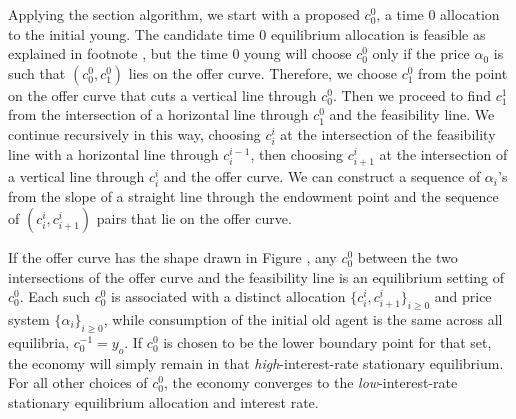 Applying the section  algorithm, we start with
a proposed $c_0^0$, a time $0$ allocation to the initial young.
The candidate time $0$ equilibrium allocation is feasible as explained in  footnote , but  the
time $0$  young will choose $c_0^0$ only if the price $\alpha_0$ is such that
$(c^0_0, c^0_1)$ lies
on the offer curve.      Therefore, we choose $c^0_1$ from
the point on the offer curve that cuts a vertical
line through  $c^0_0$.   Then we proceed to find $c^1_1$ from
the intersection of a horizontal line through $c^0_1$
and the  feasibility line.   We continue recursively in this way,
choosing $c_i^i$ at the intersection of the feasibility line
with a horizontal line through $c^{i-1}_i$, then
choosing $c_{i+1}^i$ at the intersection of a vertical
line through $c_i^i$   and the offer curve.    We can
construct a sequence of $\alpha_i$'s from the slope
of a straight line through the endowment point
and the sequence of $(c_i^i, c^i_{i+1})$  pairs that
lie on the offer curve.

 If the offer curve has the shape drawn in Figure , any %
$c_0^0$ between the 
two intersections
of the offer curve and the feasibility line is
an equilibrium setting of $c_0^0$. Each such $c_0^0$ is
associated with a distinct allocation 
$\{c^i_i, c^i_{i+1}\}_{i\geq 0}$ and
price system $\{\alpha_i\}_{i\geq 0}$, while  
consumption of the initial old agent is the
same across all equilibria, $c^{-1}_0 = y_o$.
If $c^0_0$ is chosen to be the lower boundary
point for that set, the economy will simply 
remain in that {\it high\/}-interest-rate stationary 
equilibrium. For all other choices of $c^0_0$,
the economy converges to the {\it low\/}-interest-rate
stationary equilibrium allocation and interest rate.



